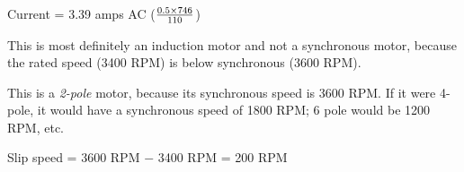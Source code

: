 
Current = 3.39 amps AC ($0.5 \times 746 \over 110$)

\vskip 10pt

This is most definitely an induction motor and not a synchronous motor, because the rated speed (3400 RPM) is below synchronous (3600 RPM).
 
\vskip 10pt

This is a {\it 2-pole} motor, because its synchronous speed is 3600 RPM.  If it were 4-pole, it would have a synchronous speed of 1800 RPM; 6 pole would be 1200 RPM, etc.

\vskip 10pt

Slip speed = 3600 RPM $-$ 3400 RPM = 200 RPM




